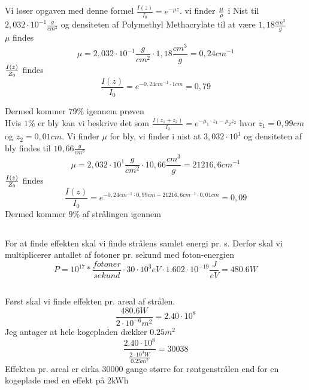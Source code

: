 \documentclass[a4paper,twoside]{article}
\begin{document}
\subsection{}
Vi løser opgaven med denne formel $\frac{I(z)}{I_0}=e^{-\mu z}$. vi finder $\mu\over\rho$ i Nist til $2,032\cdot 10^{-1} \frac{g}{cm^2}$ og densiteten af Polymethyl Methacrylate til at være $1,18\frac{cm^3}{g}$\\
$\mu$ findes
\begin{equation*}
    \mu=2,032\cdot10^{-1}\frac{g}{cm^2}\cdot1,18\frac{cm^3}{g}=0,24cm^{-1}
\end{equation*}
$I(z)\over Z_0$ findes
\begin{equation*}
    \frac{I(z)}{I_0}=e^{-0,24cm^{-1}\cdot 1cm}=0,79
\end{equation*}
 
    Dermed kommer $79\%$ igennem prøven\\
Hvis $1\%$ er bly kan vi beskrive det som $\frac{I(z_1+z_2)}{I_0}=e^{-\mu_1\cdot z_1-\mu_2 z_2}$ hvor $z_1=0,99cm$ og $z_2=0,01cm$. Vi finder $\mu$ for bly, vi finder i nist at $3,032\cdot10^1$ og densiteten af bly findes til $10,66\frac{g}{cm^3}$
\begin{equation*}
    \mu=2,032\cdot10^{1}\frac{g}{cm^2}\cdot10,66\frac{cm^3}{g}=21216,6cm^{-1}
\end{equation*}
$I(z)\over Z_0$ findes
\begin{equation*}
    \frac{I(z)}{I_0}=e^{-0,24cm^{-1}\cdot 0,99cm - 21216,6cm^{-1}\cdot 0,01cm}=0,09
\end{equation*}
Dermed kommer $9\%$ af strålingen igennem



\subsection{}
For at finde effekten skal vi finde strålens samlet energi pr. s. Derfor skal vi multiplicerer antallet af fotoner pr. sekund med foton-energien 
\begin{equation*}
P=10^{17}*\frac{fotoner}{sekund}\cdot30\cdot10^{3}eV\cdot1.602\cdot10^{-19} \frac{J}{eV}=480.6W
\end{equation*}
    
\subsection{}
Først skal vi finde effekten pr. areal af strålen. 
\begin{equation*}
    \frac{480.6W}{2\cdot10^{-6}m^2}=2.40\cdot10^{8}

\end{equation*}
Jeg antager at hele kogepladen dækker $0.25 m^2$
\begin{equation*}
    \frac{2.40\cdot10^{8}}{\frac{2\cdot10^3W}{0.25m^2}}=30038
\end{equation*}
Effekten pr. areal er cirka 30000 gange større for røntgenstrålen end for en kogeplade med en effekt på 2kWh
\end{document}
